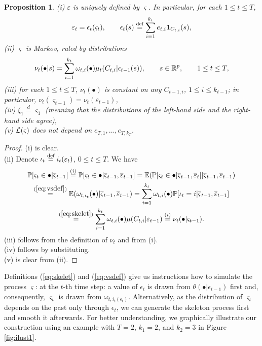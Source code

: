 \documentclass{article}              %
\newtheorem{proposition}{Proposition}
\begin{document}
\begin{proposition}
\label{prop:vs}(i) $\varepsilon$ is uniquely defined by $\varsigma$.
In particular, for each $1\leq t\leq T$, 
\[
\varepsilon_{t}=\epsilon_{t}(\varsigma_{t}),\qquad\epsilon_{t}(s)\stackrel{\text{\rm def}}{=}\sum_{i=1}^{k_{t}}e_{t,i}\mathbf{1}_{C_{t,i}}(s),
\]
(ii) $\varsigma$ is Markov, ruled by distributions 
\[
\nu_{t}(\bullet|s)=\sum_{i=1}^{k_{t}}\omega_{t,i}(\bullet)\mu_{t}(C_{t,i}|\epsilon_{t-1}(s)),\qquad s\in\mathbb{R}^p,\qquad  1\leq t\leq T,
\]
(iii) for each $1\leq t\leq T$, $\nu_{t}(\bullet)$ is constant on any $C_{t-1,i}$, $1\leq i\leq k_{t-1}$; in particular, $\nu_{t}(\varsigma_{t-1})=\nu_{t}(\varepsilon_{t-1})$,\\
(iv) $\xi_{1}\stackrel{d}{=}\varsigma_{1}$ (meaning that the distributions of the left-hand side and the right-hand side agree),\\
(v) $\mathcal{L}(\varsigma)$ does not depend on $e_{T,1},\dots,e_{T,k_T}$.
\end{proposition}

\begin{proof}
(i) is clear.\\
(ii) Denote 
$\iota_{t}\stackrel{\text{\rm def}}{=} i_{t}(\varepsilon_{t})$, $0\leq t\leq T.$
We have
\begin{multline*}
\mathbb{P}[\varsigma_{t}\in\bullet|\overline{\varsigma}_{t-1}]\stackrel{(i)}{=}\mathbb{P}[\varsigma_{t}\in\bullet|\overline{\varsigma}_{t-1},\overline{\varepsilon}_{t-1}]=\mathbb{E}(\mathbb{P}[\varsigma_{t}\in\bullet|\overline{\varsigma}_{t-1},\overline{\varepsilon}_{t}]|\overline{\varsigma}_{t-1},\overline{\varepsilon}_{t-1})
\\
\stackrel{(\ref{eq:vsdef})}{=}\mathbb{E}(\omega_{t,\iota_{t}}(\bullet)|\overline{\varsigma}_{t-1},\overline{\varepsilon}_{t-1})
=\sum_{i=1}^{k_{t}}\omega_{t,i}(\bullet)\mathbb{P}[\iota_{t}=i|\overline{\varsigma}_{t-1},\overline{\varepsilon}_{t-1}]\\ \stackrel{(\ref{eq:skelet})}{=}
\sum_{i=1}^{k_{t}}\omega_{t,i}(\bullet)\mu(C_{t,i}|\varepsilon_{t-1})
\stackrel{(i)}{=}\nu_{t}(\bullet|\varsigma_{t-1}).
\end{multline*}
(iii) follows from the definition of $\nu_t$ and from (i).\\
(iv) follows by substituting. \\
(v) is clear from (ii). 
\end{proof}
\noindent Definitions (\ref{eq:skelet}) and (\ref{eq:vsdef}) give us instructions how to simulate the process $\varsigma$: at the $t$-th time step: a value of $\epsilon_t$  is drawn from $\theta(\bullet|\epsilon_{t-1})$ first and, consequently, $\varsigma_t$ is 
drawn from $\omega_{t,i_t(\epsilon_t)}$. Alternatively, as the distribution of $\varsigma_t$ depends on the past only through $\epsilon_t$, we can generate the skeleton process first and smooth it afterwards. For better understanding, we graphically illustrate our construction 
using an example with $T=2$, $k_1=2$, and $k_2=3$ in Figure \ref{fig:ilust1}. 
\end{document}
